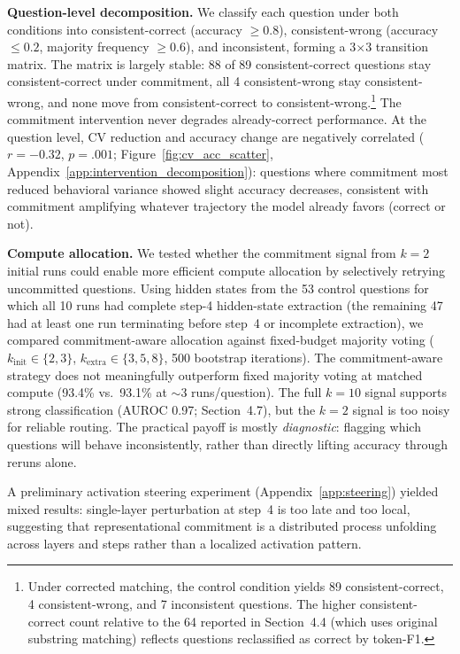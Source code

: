 \documentclass{article}
\begin{document}
\textbf{Question-level decomposition.} We classify each question under both conditions into consistent-correct (accuracy $\geq 0.8$), consistent-wrong (accuracy $\leq 0.2$, majority frequency $\geq 0.6$), and inconsistent, forming a 3$\times$3 transition matrix. The matrix is largely stable: 88 of 89 consistent-correct questions stay consistent-correct under commitment, all 4 consistent-wrong stay consistent-wrong, and none move from consistent-correct to consistent-wrong.\footnote{Under corrected matching, the control condition yields 89 consistent-correct, 4 consistent-wrong, and 7 inconsistent questions. The higher consistent-correct count relative to the 64 reported in Section~4.4 (which uses original substring matching) reflects questions reclassified as correct by token-F1.} The commitment intervention never degrades already-correct performance. At the question level, CV reduction and accuracy change are negatively correlated ($r = -0.32$, $p = .001$; Figure~\ref{fig:cv_acc_scatter}, Appendix~\ref{app:intervention_decomposition}): questions where commitment most reduced behavioral variance showed slight accuracy decreases, consistent with commitment amplifying whatever trajectory the model already favors (correct or not).

\textbf{Compute allocation.} We tested whether the commitment signal from $k{=}2$ initial runs could enable more efficient compute allocation by selectively retrying uncommitted questions. Using hidden states from the 53 control questions for which all 10 runs had complete step-4 hidden-state extraction (the remaining 47 had at least one run terminating before step~4 or incomplete extraction), we compared commitment-aware allocation against fixed-budget majority voting ($k_\text{init} \in \{2, 3\}$, $k_\text{extra} \in \{3, 5, 8\}$, 500 bootstrap iterations). The commitment-aware strategy does not meaningfully outperform fixed majority voting at matched compute (93.4\% vs.\ 93.1\% at ${\sim}$3 runs/question). The full $k{=}10$ signal supports strong classification (AUROC 0.97; Section~4.7), but the $k{=}2$ signal is too noisy for reliable routing. The practical payoff is mostly \emph{diagnostic}: flagging which questions will behave inconsistently, rather than directly lifting accuracy through reruns alone.

A preliminary activation steering experiment (Appendix~\ref{app:steering}) yielded mixed results: single-layer perturbation at step~4 is too late and too local, suggesting that representational commitment is a distributed process unfolding across layers and steps rather than a localized activation pattern.
\end{document}
